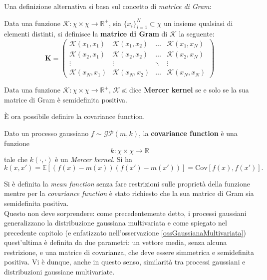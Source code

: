 Una definizione alternativa si basa sul concetto di \textit{matrice di Gram}:

\begin{defi}
Data una funzione $\mathcal{K}: \chi\times \chi\rightarrow \mathbb{R}^+$, sia $\{x_i\}_{i=1}^N\subset \chi$ un insieme qualsiasi di elementi distinti, si definisce la \textbf{matrice di Gram} di $\mathcal{K}$ la seguente:
\[
\bm{K}=\begin{pmatrix}
    \mathcal{K}(x_1,x_1) & \mathcal{K}(x_1,x_2) & \dots & \mathcal{K}(x_1,x_N)\\
    \mathcal{K}(x_2,x_1) & \mathcal{K}(x_2,x_2) & \dots & \mathcal{K}(x_2,x_N)\\
    \vdots & \vdots & \ddots & \vdots\\
    \mathcal{K}(x_N,x_1) & \mathcal{K}(x_N,x_2) & \dots & \mathcal{K}(x_N,x_N)
    \end{pmatrix}
\]
\end{defi}

\begin{defi}
Data una funzione $
\mathcal{K}: \chi\times\chi \rightarrow \mathbb{R}^+
$, $\mathcal{K}$ si dice \textbf{Mercer kernel} se e solo se la sua matrice di Gram è semidefinita positiva.
\end{defi}

È ora possibile definire la covariance function.

\newpage


\begin{defi}
Dato un processo gaussiano $f\sim \mathcal{GP}(m,k)$, la \textbf{covariance function} è una funzione
\[
k:\chi\times \chi \rightarrow \mathbb{R}
\]
tale che $k(\cdot,\cdot)$ è un \textit{Mercer kernel}. Si ha 
\[k(x,x')=\mathbb{E}[(f(x)-m(x))(f(x')-m(x'))]=\text{Cov}[f(x),f(x')].
\]
\end{defi}

\begin{oss}
Si è definita la \textit{mean function} senza fare restrizioni sulle proprietà della funzione mentre per la \textit{covariance function} è stato richiesto che la sua matrice di Gram sia semidefinita positiva.\\
Questo non deve sorprendere: come precedentemente detto, i processi gaussiani generalizzano la distribuzione gaussiana multivariata e come spiegato nel precedente capitolo (e enfatizzato nell'osservazione \ref{ossGaussianaMultivariata}) quest'ultima è definita da due parametri: un vettore media, senza alcuna restrizione, e una matrice di covarianza, che deve essere simmetrica e  semidefinita positiva. Vi è dunque, anche in questo senso, similarità tra processi gaussiani e distribuzioni gaussiane multivariate.
\end{oss}

